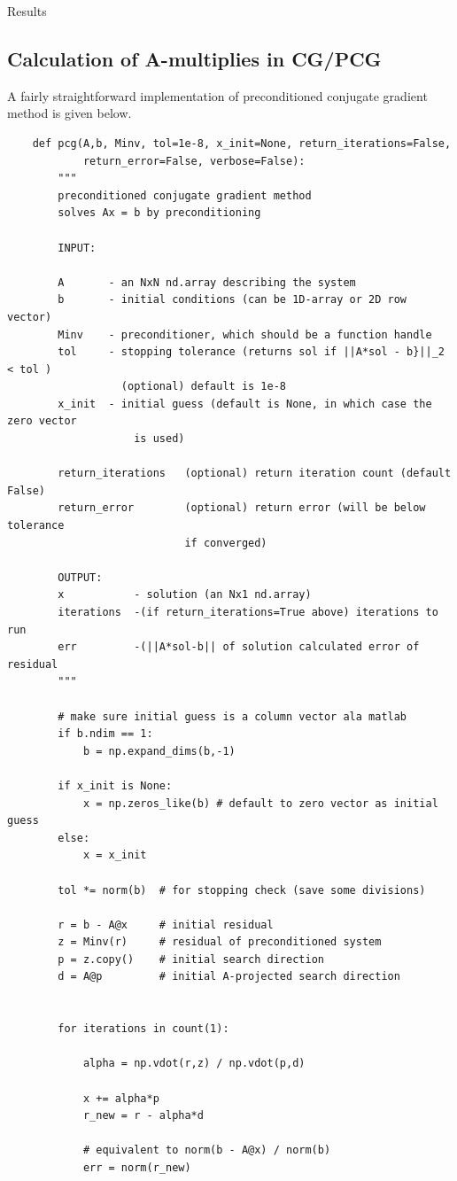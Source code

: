 \documentclass[10pt]{article}
\theoremstyle{definition}
\begin{document}
\begin{section}{Results}
\subsection{Calculation of A-multiplies in CG/PCG}
	A fairly straightforward implementation of preconditioned conjugate gradient method is given below.
	\begin{lstlisting}
	def pcg(A,b, Minv, tol=1e-8, x_init=None, return_iterations=False,
	        return_error=False, verbose=False):
	    """
	    preconditioned conjugate gradient method
	    solves Ax = b by preconditioning
	
	    INPUT:
	
	    A       - an NxN nd.array describing the system
	    b       - initial conditions (can be 1D-array or 2D row vector)
	    Minv    - preconditioner, which should be a function handle
	    tol     - stopping tolerance (returns sol if ||A*sol - b}||_2 < tol ) 
	              (optional) default is 1e-8
	    x_init  - initial guess (default is None, in which case the zero vector
	                is used)
	
	    return_iterations   (optional) return iteration count (default False)
	    return_error        (optional) return error (will be below tolerance
	                        if converged)
	
	    OUTPUT:
	    x           - solution (an Nx1 nd.array)
	    iterations  -(if return_iterations=True above) iterations to run
	    err         -(||A*sol-b|| of solution calculated error of residual
	    """
	
	    # make sure initial guess is a column vector ala matlab
	    if b.ndim == 1:
	        b = np.expand_dims(b,-1)
	    
	    if x_init is None:
	        x = np.zeros_like(b) # default to zero vector as initial guess
	    else:
	        x = x_init
	
	    tol *= norm(b)  # for stopping check (save some divisions)
	
	    r = b - A@x     # initial residual
	    z = Minv(r)     # residual of preconditioned system
	    p = z.copy()    # initial search direction
	    d = A@p         # initial A-projected search direction
	
	
	    for iterations in count(1):
	
	        alpha = np.vdot(r,z) / np.vdot(p,d)
	
	        x += alpha*p
	        r_new = r - alpha*d
	        
	        # equivalent to norm(b - A@x) / norm(b)
	        err = norm(r_new)
	

\end{lstlisting}
\end{section}
\end{document}
